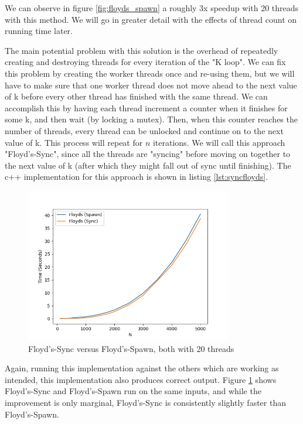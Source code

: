 \documentclass[conference]{IEEEtran}
\begin{document}
We can observe in figure \ref{fig:floyds_spawn} a roughly 3x speedup with 20 threads with this method. We will go in greater detail with the effects of thread count on running time later. 

The main potential problem with this solution is the overhead of repeatedly creating and destroying threads for every iteration of the "K loop". We can fix this problem by creating the worker threads once and re-using them, but we will have to make sure that one worker thread does not move ahead to the next value of k before every other thread has finished with the same thread. We can accomplish this by having each thread increment a counter when it finishes for some k, and then wait (by locking a mutex). Then, when this counter reaches the number of threads, every thread can be unlocked and continue on to the next value of k. This process will repeat for $n$ iterations. We will call this approach "Floyd's-Sync", since all the threads are "syncing" before moving on together to the next value of k (after which they might fall out of sync until finishing). The c++ implementation for this approach is shown in listing \ref{lst:syncfloyds}.

\begin{figure}[t]
    
\end{figure}

\begin{figure}[t]
    \centering
    \includegraphics[width=9cm]{images/benchsync.png}
    \caption{Floyd's-Sync versus Floyd's-Spawn, both with 20 threads}
    \label{fig:floyds_both}
\end{figure}


Again, running this implementation against the others which are working as intended, this implementation also produces correct output. Figure \ref{fig:floyds_both} shows Floyd's-Sync and Floyd's-Spawn run on the same inputs, and while the improvement is only marginal, Floyd's-Sync is consistently slightly faster than Floyd's-Spawn.
\end{document}
